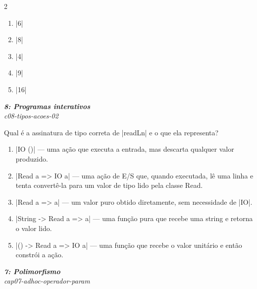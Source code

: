 \documentclass[a4paper,10pt,brazil]{article}
\begin{document}
\begin{multicols}{2}
\begin{enumerate}
  \item \haskellinline|6|

  \item \haskellinline|8|

  \item \haskellinline|4|

  \item \haskellinline|9|

  \item \haskellinline|16|


\end{enumerate}

\begin{flushright}
  \footnotesize
  \textit{\textbf{8: Programas interativos}}\\
  \textit{c08-tipos-acoes-02}\\

\end{flushright}
Qual é a assinatura de tipo correta de \haskellinline|readLn| e o que ela representa?

\begin{enumerate}
  \item \haskellinline|IO ()| — uma ação que executa a entrada, mas descarta qualquer valor produzido.

  \item \haskellinline|Read a => IO a| — uma ação de E/S que, quando executada, lê uma linha e tenta convertê-la para um valor de tipo lido pela classe Read.

  \item \haskellinline|Read a => a| — um valor puro obtido diretamente, sem necessidade de \haskellinline|IO|.

  \item \haskellinline|String -> Read a => a| — uma função pura que recebe uma string e retorna o valor lido.

  \item \haskellinline|() -> Read a => IO a| — uma função que recebe o valor unitário e então constrói a ação.


\end{enumerate}

\begin{flushright}
  \footnotesize
  \textit{\textbf{7: Polimorfismo}}\\
  \textit{cap07-adhoc-operador-param}\\


\end{flushright}
\end{multicols}
\end{document}
